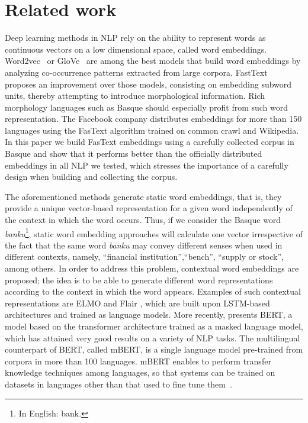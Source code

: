 \documentclass[10pt, a4paper]{article}
\begin{document}
\section{Related work}\label{sec:related-work}


Deep learning methods in NLP rely on the ability to represent words as continuous vectors on a low dimensional space, called word embeddings. Word2vec~\cite{mikolov2013distributed} or GloVe~\cite{Pennington14glove:global} are among the best models that build word embeddings by analyzing co-occurrence patterns extracted from large corpora. FastText~\cite{fasttext1_bojanowski2017enriching} proposes an improvement over those models, consisting on embedding subword units, thereby attempting to introduce morphological information. Rich morphology languages such as Basque should especially profit from such word representation. The Facebook company distributes embeddings for more than 150 languages using the FasText algorithm trained on common crawl and  Wikipedia. In this paper we build FasText embeddings using a carefully collected corpus in Basque and show that it performs better than the officially distributed embeddings in all NLP we tested, which stresses the importance of a carefully design when building and collecting the corpus.

The aforementioned methods generate static word embeddings, that is, they provide a unique vector-based representation for a given word independently of the context in which the word occurs. Thus, if we consider the Basque word \emph{banku}\footnote{In English: bank.}, static word embedding approaches will calculate one vector irrespective of the fact that the same word \emph{banku} may convey different senses when used in different contexts, namely, ``financial institution'',``bench'', ``supply or stock'', among others. In order to address this problem, contextual word embeddings are proposed; the idea is to be able to generate different word representations according to the context in which the word appears. Examples of such contextual representations are ELMO \cite{Peters:2018} and Flair \cite{akbik2018coling}, which are built upon LSTM-based architectures and trained as language models. More recently,  presents BERT, a model based on the transformer architecture trained as a masked language model, which has attained very good results on a variety of NLP tasks. The multilingual counterpart of BERT, called mBERT, is a single language model pre-trained from corpora in more than 100 languages. mBERT enables to perform transfer knowledge techniques among languages, so that systems can be trained on datasets in languages other than that used to fine tune them~\cite{heinzerling-strube-2019-sequence,DBLP:conf/acl/PiresSG19}.
\end{document}
